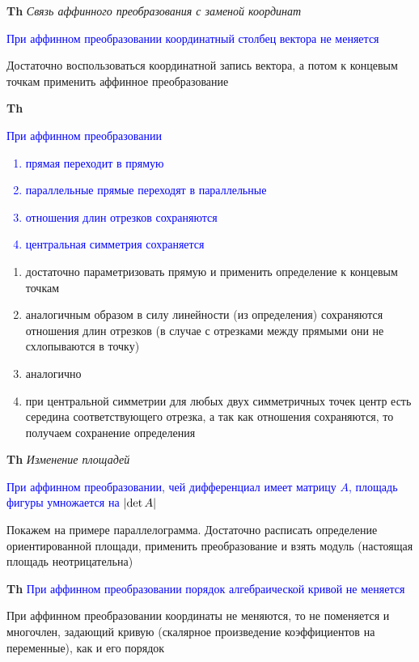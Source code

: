 \documentclass[a4paper, 14pt]{article}
\begin{document}
    \textbf{Th} \textit{Связь аффинного преобразования с заменой координат}

    \textcolor{blue}{При аффинном преобразовании координатный столбец вектора не меняется}

    Достаточно воспользоваться координатной запись вектора, а потом к концевым точкам применить аффинное преобразование

    \textbf{Th} \textcolor{blue}{При аффинном преобразовании
        \begin{enumerate}
            \item прямая переходит в прямую
            \item параллельные прямые переходят в параллельные
            \item отношения длин отрезков сохраняются
            \item центральная симметрия сохраняется
        \end{enumerate}           }

    \begin{enumerate}
        \item достаточно параметризовать прямую и применить определение к концевым точкам
        \item аналогичным образом в силу линейности (из определения) сохраняются отношения длин отрезков (в случае с
        отрезками между прямыми они не схлопываются в точку)
        \item аналогично
        \item при центральной симметрии для любых двух симметричных точек центр есть середина соответствующего
        отрезка, а так как отношения сохраняются, то получаем сохранение определения
    \end{enumerate}

    \textbf{Th} \textit{Изменение площадей}

    \textcolor{blue}{При аффинном преобразовании, чей дифференциал имеет матрицу $A$, площадь фигуры умножается
    на $\abs{\det A}$}

    Покажем на примере параллелограмма.
    Достаточно расписать определение ориентированной площади, применить преобразование и взять модуль (настоящая
    площадь неотрицательна)

    \textbf{Th} \textcolor{blue}{При аффинном преобразовании порядок алгебраической кривой не меняется}

    При аффинном преобразовании координаты не меняются, то не поменяется и многочлен, задающий кривую (скалярное
    произведение коэффициентов на переменные), как и его порядок
\end{document}
